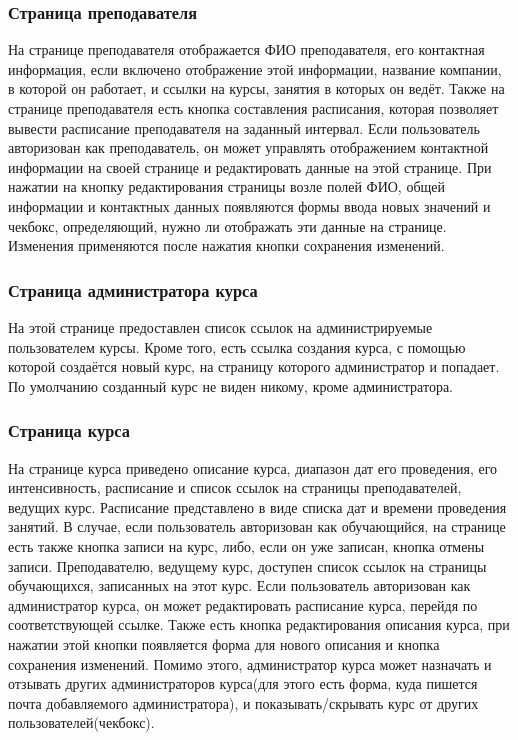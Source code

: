 \documentclass[11pt]{article}
\begin{document}
\subsubsection{Страница преподавателя}
\label{sec:orgdaab3d9}
На странице преподавателя отображается ФИО преподавателя, его контактная информация, если
включено отображение этой информации, название компании, в которой он работает,
и ссылки на курсы, занятия в которых он ведёт. Также на странице преподавателя есть кнопка
составления расписания, которая позволяет вывести расписание преподавателя на заданный интервал.
Если пользователь авторизован как преподаватель, он может управлять отображением контактной
информации на своей странице и редактировать данные на этой странице. При нажатии на кнопку редактирования страницы возле полей ФИО,
общей информации и контактных данных появляются формы ввода новых значений и чекбокс,
определяющий, нужно ли отображать эти данные на странице. Изменения применяются после нажатия
кнопки сохранения изменений.
\subsubsection{Страница администратора курса}
\label{sec:org3557bf5}
На этой странице предоставлен список ссылок на администрируемые пользователем курсы. Кроме
того, есть ссылка создания курса, с помощью которой создаётся новый курс, на страницу которого
администратор и попадает. По умолчанию созданный курс не виден никому, кроме администратора.
\subsubsection{Страница курса}
\label{sec:orga564a8a}
На странице курса приведено описание курса, диапазон дат его проведения, его интенсивность,
расписание и список ссылок на страницы преподавателей, ведущих курс.
Расписание представлено в виде списка дат и времени проведения занятий. В случае, если пользователь авторизован как
обучающийся, на странице есть также кнопка записи на курс, либо, если он уже записан, кнопка отмены записи.
Преподавателю, ведущему курс, доступен список ссылок на страницы обучающихся,
записанных на этот курс.
Если пользователь авторизован как администратор курса, он может редактировать расписание курса,
перейдя по соответствующей ссылке. Также есть кнопка редактирования описания курса, при нажатии
этой кнопки появляется форма для нового описания и кнопка сохранения изменений. Помимо этого, администратор курса
может назначать и отзывать других администраторов курса(для этого есть форма, куда пишется почта
добавляемого администратора), и показывать/скрывать курс от других пользователей(чекбокс).
\end{document}
